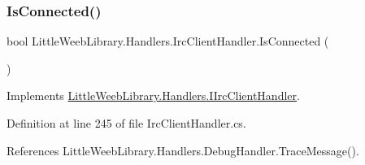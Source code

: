 \subsubsection{\texorpdfstring{Is\+Connected()}{IsConnected()}}
{\footnotesize\ttfamily bool Little\+Weeb\+Library.\+Handlers.\+Irc\+Client\+Handler.\+Is\+Connected (\begin{DoxyParamCaption}{ }\end{DoxyParamCaption})}



Implements \mbox{\hyperlink{interface_little_weeb_library_1_1_handlers_1_1_i_irc_client_handler_ae2c21ca5104d4aaceeccd1268e0d52b2}{Little\+Weeb\+Library.\+Handlers.\+I\+Irc\+Client\+Handler}}.



Definition at line 245 of file Irc\+Client\+Handler.\+cs.



References Little\+Weeb\+Library.\+Handlers.\+Debug\+Handler.\+Trace\+Message().


